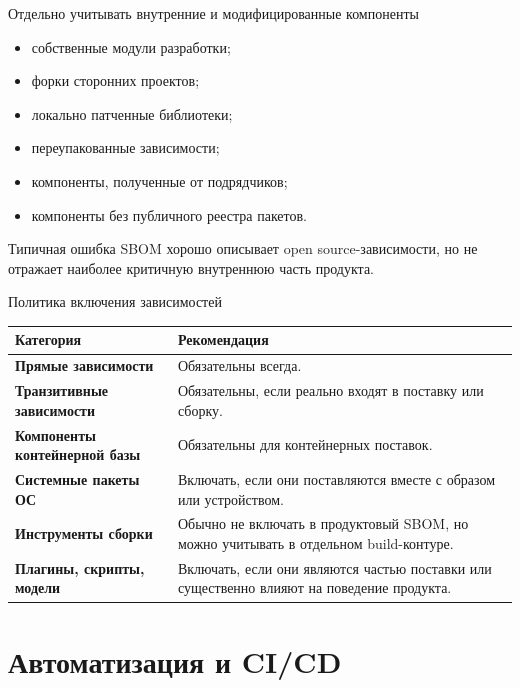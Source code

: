 \documentclass[aspectratio=169,10pt]{beamer}
\begin{document}
\begin{frame}{Отдельно учитывать внутренние и модифицированные компоненты}
\begin{itemize}
  \item собственные модули разработки;
  \item форки сторонних проектов;
  \item локально патченные библиотеки;
  \item переупакованные зависимости;
  \item компоненты, полученные от подрядчиков;
  \item компоненты без публичного реестра пакетов.
\end{itemize}

\begin{alertblock}{Типичная ошибка}
SBOM хорошо описывает open source-зависимости, но не отражает наиболее критичную внутреннюю часть продукта.
\end{alertblock}
\end{frame}

\begin{frame}{Политика включения зависимостей}
\begin{table}
\footnotesize
\begin{tabularx}{\textwidth}{>{\bfseries}p{3cm}Y}
\toprule
Категория & Рекомендация \\
\midrule
Прямые зависимости & Обязательны всегда. \\
Транзитивные зависимости & Обязательны, если реально входят в поставку или сборку. \\
Компоненты контейнерной базы & Обязательны для контейнерных поставок. \\
Системные пакеты ОС & Включать, если они поставляются вместе с образом или устройством. \\
Инструменты сборки & Обычно не включать в продуктовый SBOM, но можно учитывать в отдельном build-контуре. \\
Плагины, скрипты, модели & Включать, если они являются частью поставки или существенно влияют на поведение продукта. \\
\bottomrule
\end{tabularx}
\end{table}
\end{frame}

\section{Автоматизация и CI/CD}
\end{document}

